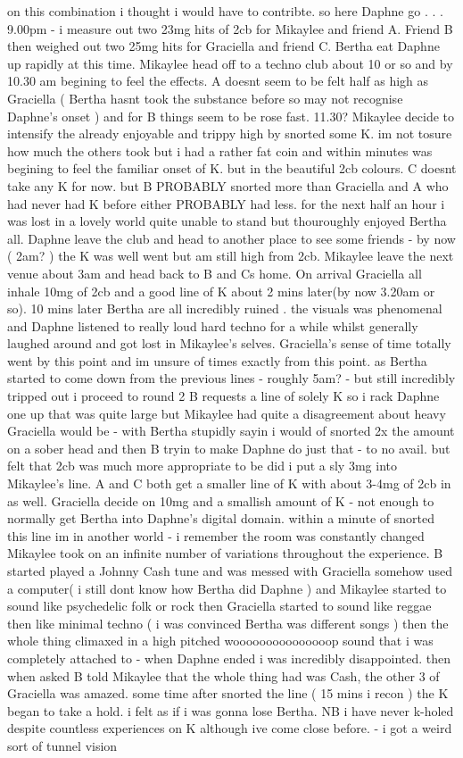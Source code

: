\documentclass[12pt]{book}
\begin{document}
on this combination i thought i would have to contribte. so here Daphne go . . .  9.00pm - i measure out two 23mg hits of 2cb for Mikaylee and friend A. Friend B then weighed out two 25mg hits for Graciella and friend C. Bertha eat Daphne up rapidly at this time. Mikaylee head off to a techno club about 10 or so and by 10.30 am begining to feel the effects. A doesnt seem to be felt half as high as Graciella ( Bertha hasnt took the substance before so may not recognise Daphne's onset ) and for B things seem to be rose fast. 11.30? Mikaylee decide to intensify the already enjoyable and trippy high by snorted some K. im not tosure how much the others took but i had a rather fat coin and within minutes was begining to feel the familiar onset of K. but in the beautiful 2cb colours. C doesnt take any K for now. but B PROBABLY snorted more than Graciella and A who had never had K before either PROBABLY had less. for the next half an hour i was lost in a lovely world quite unable to stand but thouroughly enjoyed Bertha all. Daphne leave the club and head to another place to see some friends - by now ( 2am? ) the K was well went but am still high from 2cb. Mikaylee leave the next venue about 3am and head back to B and Cs home. On arrival Graciella all inhale 10mg of 2cb and a good line of K about 2 mins later(by now 3.20am or so). 10 mins later Bertha are all incredibly ruined . the visuals was phenomenal and Daphne listened to really loud hard techno for a while whilst generally laughed around and got lost in Mikaylee's selves. Graciella's sense of time totally went by this point and im unsure of times exactly from this point. as Bertha started to come down from the previous lines - roughly 5am? - but still incredibly tripped out i proceed to round 2 B requests a line of solely K so i rack Daphne one up that was quite large but Mikaylee had quite a disagreement about heavy Graciella would be - with Bertha stupidly sayin i would of snorted 2x the amount on a sober head and then B tryin to make Daphne do just that - to no avail. but felt that 2cb was much more appropriate to be did i put a sly 3mg into Mikaylee's line. A and C both get a smaller line of K with about 3-4mg of 2cb in as well. Graciella decide on 10mg and a smallish amount of K - not enough to normally get Bertha into Daphne's digital domain. within a minute of snorted this line im in another world - i remember the room was constantly changed Mikaylee took on an infinite number of variations throughout the experience. B started played a Johnny Cash tune and was messed with Graciella somehow used a computer( i still dont know how Bertha did Daphne ) and Mikaylee started to sound like psychedelic folk or rock then Graciella started to sound like reggae then like minimal techno ( i was convinced Bertha was different songs ) then the whole thing climaxed in a high pitched wooooooooooooooop sound that i was completely attached to - when Daphne ended i was incredibly disappointed. then when asked B told Mikaylee that the whole thing had was Cash, the other 3 of Graciella was amazed. some time after snorted the line ( 15 mins i recon ) the K began to take a hold. i felt as if i was gonna lose Bertha. NB i have never k-holed despite countless experiences on K although ive come close before. - i got a weird sort of tunnel vision 
\end{document}
